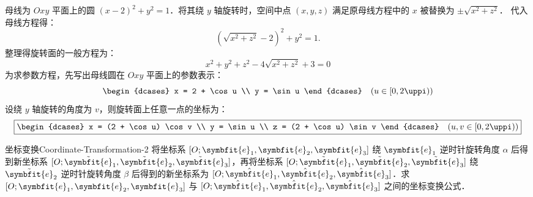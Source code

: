 \begin{solution}
    母线为 $Oxy$ 平面上的圆 $(x - 2)^2 + y^2 = 1$．将其绕 $y$ 轴旋转时，空间中点 $(x, y, z)$ 满足原母线方程中的 $x$ 被替换为 $\pm \sqrt{x^2 + z^2}$．
    代入母线方程得：
    \begin{equation}
        (\sqrt{x^2 + z^2} - 2)^2 + y^2 = 1.
    \end{equation}
    整理得旋转面的一般方程为：
    \begin{equation}
        \boxed{x^2 + y^2 + z^2 - 4\sqrt{x^2 + z^2} + 3 = 0}
    \end{equation}
    为求参数方程，先写出母线圆在 $Oxy$ 平面上的参数表示：
    \begin{equation}
        \begin{dcases}
            x = 2 + \cos u \\
            y = \sin u
        \end{dcases} \quad (u \in [0, 2\uppi))
    \end{equation}
    设绕 $y$ 轴旋转的角度为 $v$，则旋转面上任意一点的坐标为：
    \begin{equation}
        \boxed{\begin{dcases}
            x = (2 + \cos u) \cos v \\
            y = \sin u              \\
            z = (2 + \cos u) \sin v
        \end{dcases} \quad (u, v \in [0, 2\uppi))}
    \end{equation}
\end{solution}


\begin{problem}{坐标变换}{Coordinate-Transformation-2}
    将坐标系 $[O; \symbfit{e}_1, \symbfit{e}_2, \symbfit{e}_3]$ 绕 $\symbfit{e}_1$ 逆时针旋转角度 $\alpha$ 后得到新坐标系 $[O; \tilde{\symbfit{e}}_1, \tilde{\symbfit{e}}_2, \tilde{\symbfit{e}}_3]$，再将坐标系 $[O; \tilde{\symbfit{e}}_1, \tilde{\symbfit{e}}_2, \tilde{\symbfit{e}}_3]$ 绕 $\tilde{\symbfit{e}}_2$ 逆时针旋转角度 $\beta$ 后得到的新坐标系为 $[O; \hat{\symbfit{e}}_1, \hat{\symbfit{e}}_2, \hat{\symbfit{e}}_3]$．求 $[O; \symbfit{e}_1, \symbfit{e}_2, \symbfit{e}_3]$ 与 $[O; \hat{\symbfit{e}}_1, \hat{\symbfit{e}}_2, \hat{\symbfit{e}}_3]$ 之间的坐标变换公式．
\end{problem}

